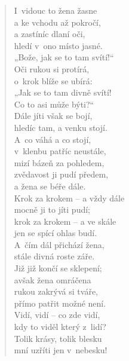 \begin{verse}
I~vidouc to žena žasne \\
a ke vchodu až pokročí, \\
a zastíníc dlaní oči, \\
hledí v~ono místo jasné. \\
„Bože, jak se to tam svítí!“ \\
Oči rukou si protírá, \\
o~krok blíže se ubírá: \\
„Jak se to tam divně svítí! \\
Co to asi může býti?“ \\
Dále jíti však se bojí, \\
hledíc tam, a venku stojí. \\
A~co váhá a co stojí, \\
v~klenbu patříc neustále, \\
mizí bázeň za pohledem, \\
zvědavost ji pudí předem, \\
a žena se béře dále. \\
Krok za krokem -- a vždy dále \\
mocně ji to jíti pudí; \\
krok za krokem -- a ve skále \\
jen se spící ohlas budí. \\
A~čím dál přichází žena, \\
stále divná roste záře. \\
Již již končí se sklepení; \\
avšak žena omráčena \\
rukou zakrývá si tváře, \\
přímo patřit možné není. \\
Vidí, vidí -- co zde vidí, \\
kdy to viděl který z~lidí? \\
Tolik krásy, tolik blesku \\
mní uzříti jen v~nebesku!
\end{verse}

